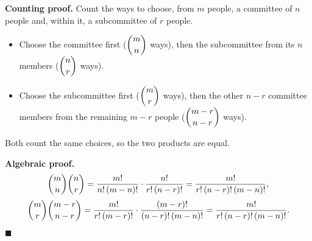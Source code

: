 \textbf{Counting proof.} Count the ways to choose, from $m$ people, a committee of $n$ people and, within it, a subcommittee of $r$ people.
\begin{itemize}
\item Choose the committee first ($\dbinom mn$ ways), then the subcommittee from its $n$ members ($\dbinom nr$ ways).
\item Choose the subcommittee first ($\dbinom mr$ ways), then the other $n-r$ committee members from the remaining $m-r$ people ($\dbinom{m-r}{n-r}$ ways).
\end{itemize}
Both count the same choices, so the two products are equal.

\textbf{Algebraic proof.}
\[\dbinom mn\dbinom nr=\dfrac{m!}{n!\,(m-n)!}\cdot\dfrac{n!}{r!\,(n-r)!}=\dfrac{m!}{r!\,(n-r)!\,(m-n)!},\]
\[\dbinom mr\dbinom{m-r}{n-r}=\dfrac{m!}{r!\,(m-r)!}\cdot\dfrac{(m-r)!}{(n-r)!\,(m-n)!}=\dfrac{m!}{r!\,(n-r)!\,(m-n)!}.\]
$\blacksquare$
